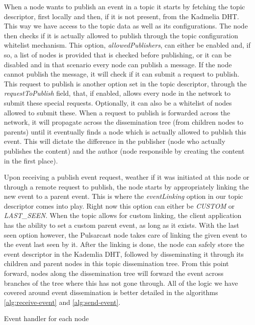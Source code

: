 When a node wants to publish an event in a topic it starts by fetching the
topic descriptor, first locally and then, if it is not present, from the
Kadmelia DHT.  This way we have access to the topic data as well as its
configurations. The node then checks if it is actually allowed to publish
through the topic configuration whitelist mechanism. This option,
\emph{allowedPublishers}, can either be enabled and, if so, a list of nodes is
provided that is checked before publishing, or it can be disabled and in that
scenario every node can publish a message. If the node cannot publish the
message, it will check if it can submit a request to publish. This request to
publish is another option set in the topic descriptor, through the
\emph{requestToPublish} field, that, if enabled, allows every node in the
network to submit these special requests. Optionally, it can also be a
whitelist of nodes allowed to submit these. When a request to publish is
forwarded across the network, it will propagate across the dissemination tree
(from children nodes to parents) until it eventually finds a node which is
actually allowed to publish this event. This will dictate the difference in the
publisher (node who actually publishes the content) and the author (node
responsible by creating the content in the first place).

Upon receiving a publish event request, weather if it was initiated at this
node or through a remote request to publish, the node starts by appropriately
linking the new event to a parent event. This is where the \emph{eventLinking}
option in our topic descriptor comes into play. Right now this option can
either be \emph{CUSTOM} or \emph{LAST\_SEEN}. When the topic allows for custom
linking, the client application has the ability to set a custom parent event,
as long as it exists. With the last seen option however, the Pulsarcast node
takes care of linking the given event to the event last seen by it. After the
linking is done, the node can safely store the event descriptor in the Kademlia
DHT, followed by disseminating it through its children and parent nodes in this
topic dissemination tree. From this point forward, nodes along the
dissemination tree will forward the event across branches of the tree where
this has not gone through. All of the logic we have covered around event
dissemination is better detailed in the algorithms \ref{alg:receive-event} and
\ref{alg:send-event}.

\vspace{8pt}
\begin{algorithm}[H]
  \SetAlgoLined
  \caption{Event handler for each node}
	\label{alg:receive-event}
\end{algorithm}
\vspace{8pt}

